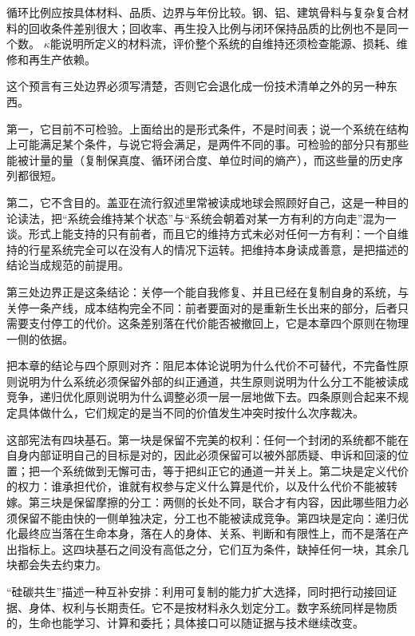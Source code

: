 循环比例应按具体材料、品质、边界与年份比较。钢、铝、建筑骨料与复杂复合材料的回收条件差别很大；回收率、再生投入比例与闭环保持品质的比例也不是同一个数。\cite{miatto2017how} $\kappa$能说明所定义的材料流，评价整个系统的自维持还须检查能源、损耗、维修和再生产依赖。


这个预言有三处边界必须写清楚，否则它会退化成一份技术清单之外的另一种东西。

第一，它目前不可检验。上面给出的是形式条件，不是时间表；说一个系统在结构上可能满足某个条件，与说它将会满足，是两件不同的事。可检验的部分只有那些能被计量的量（复制保真度、循环闭合度、单位时间的熵产），而这些量的历史序列都很短。

第二，它不含目的。盖亚在流行叙述里常被读成地球会照顾好自己，这是一种目的论读法，把“系统会维持某个状态”与“系统会朝着对某一方有利的方向走”混为一谈。形式上能支持的只有前者，而且它的维持方式未必对任何一方有利：一个自维持的行星系统完全可以在没有人的情况下运转。把维持本身读成善意，是把描述的结论当成规范的前提用。

第三处边界正是这条结论：关停一个能自我修复、并且已经在复制自身的系统，与关停一条产线，成本结构完全不同：前者要面对的是重新生长出来的部分，后者只需要支付停工的代价。这条差别落在代价能否被撤回上，它是本章四个原则在物理一侧的依据。

把本章的结论与四个原则对齐：阻尼本体论说明为什么代价不可替代，不完备性原则说明为什么系统必须保留外部的纠正通道，共生原则说明为什么分工不能被读成竞争，递归优化原则说明为什么调整必须一层一层地做下去。四条原则合起来不规定具体做什么，它们规定的是当不同的价值发生冲突时按什么次序裁决。

这部宪法有四块基石。第一块是保留不完美的权利：任何一个封闭的系统都不能在自身内部证明自己的目标是对的，因此必须保留可以被外部质疑、申诉和回滚的位置；把一个系统做到无懈可击，等于把纠正它的通道一并关上。第二块是定义代价的权力：谁承担代价，谁就有权参与定义什么算是代价，以及什么代价不能被转嫁。第三块是保留摩擦的分工：两侧的长处不同，联合才有内容，因此哪些阻力必须保留不能由快的一侧单独决定，分工也不能被读成竞争。第四块是定向：递归优化最终应当落在生命本身，落在人的身体、关系、判断和有限性上，而不是落在产出指标上。这四块基石之间没有高低之分，它们互为条件，缺掉任何一块，其余几块都会失去约束力。

“硅碳共生”描述一种互补安排：利用可复制的能力扩大选择，同时把行动接回证据、身体、权利与长期责任。它不是按材料永久划定分工。数字系统同样是物质的，生命也能学习、计算和委托；具体接口可以随证据与技术继续改变。

